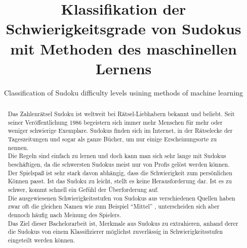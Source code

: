 \documentclass[accentcolor=tud6b,11pt,paper=a4]{tudreport}
\title{Klassifikation der Schwierigkeitsgrade von Sudokus mit Methoden des maschinellen Lernens}
\subtitle{Classification of Sudoku difficulty levels usining methods of machine learning}
\begin{document}
\maketitle

\begin{abstract}
Das Zahlenrätsel Sudoku ist weltweit bei Rätsel-Liebhabern bekannt und beliebt. Seit seiner Veröffentlichung 1986 begeistern sich immer mehr Menschen für mehr oder weniger schwierige Exemplare. Sudokus finden sich im Internet, in der Rätselecke der Tageszeitungen und sogar als ganze Bücher, um nur einige Erscheinungsorte zu nennen. \\
Die Regeln sind einfach zu lernen und doch kann man sich sehr lange mit Sudokus beschäftigen, da die schwersten Sudokus meist nur von Profis gelöst werden können.\\
Der Spielspaß ist sehr stark davon abhängig, dass die Schwierigkeit zum persönlichen Können passt. Ist das Sudoku zu leicht, stellt es keine Herausforderung dar. Ist es zu schwer, kommt schnell ein Gefühl der Überforderung auf. \\
Die ausgewiesenen Schwierigkeitsstufen von Sudokus aus verschiedenen Quellen haben zwar oft die gleichen Namen wie zum Beispiel 
\textquotedblleft Mittel\textquotedblright
, unterscheiden sich aber dennoch häufig nach Meinung des Spielers.\\
Das Ziel dieser Bachelorarbeit ist, Merkmale aus Sudokus zu extrahieren, anhand derer die Sudokus von einem Klassifizierer möglichst zuverlässig in Schwierigkeitsstufen eingeteilt werden können.\\
\end{abstract}

\tableofcontents




	
	
\end{document}
